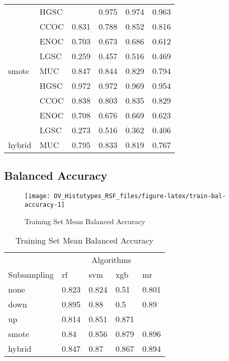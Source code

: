 \documentclass[
]{report}
\begin{document}
\begin{table}
\begin{tabular}[t]{l|l|l|l|l|l}
\cline{1-6}
 & HGSC & \cellcolor[HTML]{90ee90}{0.977} & 0.975 & 0.974 & 0.963\\
\cline{2-6}
 & CCOC & 0.831 & 0.788 & 0.852 & 0.816\\
\cline{2-6}
 & ENOC & 0.703 & 0.673 & 0.686 & 0.612\\
\cline{2-6}
 & LGSC & 0.259 & 0.457 & 0.516 & 0.469\\
\cline{2-6}
\multirow{-5}{*}{\raggedright\arraybackslash smote} & MUC & 0.847 & 0.844 & 0.829 & 0.794\\
\cline{1-6}
 & HGSC & 0.972 & 0.972 & 0.969 & 0.954\\
\cline{2-6}
 & CCOC & 0.838 & 0.803 & 0.835 & 0.829\\
\cline{2-6}
 & ENOC & 0.708 & 0.676 & 0.669 & 0.623\\
\cline{2-6}
 & LGSC & 0.273 & 0.516 & 0.362 & 0.406\\
\cline{2-6}
\multirow{-5}{*}{\raggedright\arraybackslash hybrid} & MUC & 0.795 & 0.833 & 0.819 & 0.767\\
\hline
\end{tabular}
\end{table}

\subsection{Balanced Accuracy}\label{balanced-accuracy-1}

\begin{figure}[H]

{\centering \texttt{[image: OV\_Histotypes\_RSF\_files/figure-latex/train-bal-accuracy-1]} 

}

\caption{Training Set Mean Balanced Accuracy}\label{fig:train-bal-accuracy}
\end{figure}

\begin{table}

\caption{\label{tab:train-bal-accuracy-table}Training Set Mean Balanced Accuracy}
\centering
\begin{tabular}[t]{l|l|l|l|l}
\hline
\multicolumn{1}{c|}{ } & \multicolumn{4}{c}{Algorithms} \\
\cline{2-5}
Subsampling & rf & svm & xgb & mr\\
\hline
none & 0.823 & 0.824 & 0.51 & 0.801\\
\hline
down & 0.895 & 0.88 & 0.5 & 0.89\\
\hline
up & 0.814 & 0.851 & 0.871 & \cellcolor[HTML]{90ee90}{0.897}\\
\hline
smote & 0.84 & 0.856 & 0.879 & 0.896\\
\hline
hybrid & 0.847 & 0.87 & 0.867 & 0.894\\
\hline
\end{tabular}
\end{table}
\end{document}
